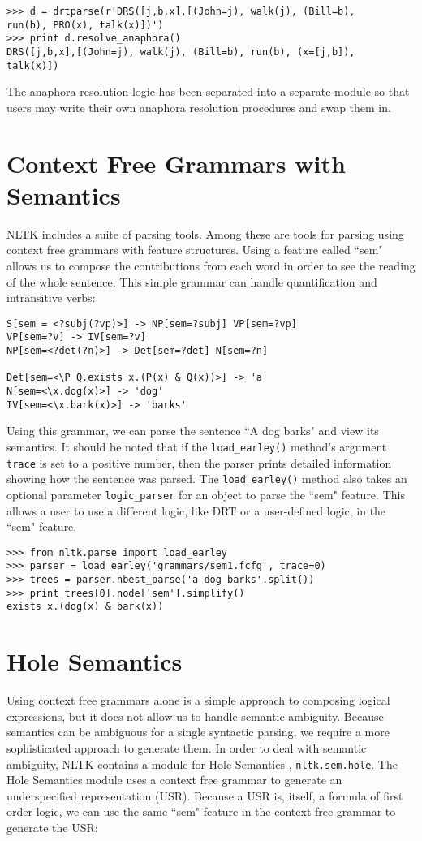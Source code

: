 \documentclass{article}
\newcommand{\dhgcode}[1]{{\tt #1}}
\begin{document}
\begin{verbatim}
>>> d = drtparse(r'DRS([j,b,x],[(John=j), walk(j), (Bill=b), 
run(b), PRO(x), talk(x)])')
>>> print d.resolve_anaphora()
DRS([j,b,x],[(John=j), walk(j), (Bill=b), run(b), (x=[j,b]), 
talk(x)])
\end{verbatim}

The anaphora resolution logic has been separated into a separate module so that users may write their own anaphora resolution procedures and swap them in.


\section{Context Free Grammars with Semantics}
NLTK includes a suite of parsing tools.  Among these are tools for parsing using context free grammars with feature structures.  Using a feature called ``sem" allows us to compose the contributions from each word in order to see the reading of the whole sentence.  This simple grammar can handle quantification and intransitive verbs:

\begin{verbatim}
S[sem = <?subj(?vp)>] -> NP[sem=?subj] VP[sem=?vp]
VP[sem=?v] -> IV[sem=?v]
NP[sem=<?det(?n)>] -> Det[sem=?det] N[sem=?n]

Det[sem=<\P Q.exists x.(P(x) & Q(x))>] -> 'a'
N[sem=<\x.dog(x)>] -> 'dog'
IV[sem=<\x.bark(x)>] -> 'barks'
\end{verbatim}

Using this grammar, we can parse the sentence ``A dog barks" and view its semantics.  It should be noted that if the \dhgcode{load\_earley()} method's argument \dhgcode{trace} is set to a positive number, then the parser prints detailed information showing how the sentence was parsed.  The \dhgcode{load\_earley()} method also takes an optional parameter \dhgcode{logic\_parser} for an object to parse the ``sem" feature.  This allows a user to use a different logic, like DRT or a user-defined logic, in the ``sem" feature.

\begin{verbatim}
>>> from nltk.parse import load_earley
>>> parser = load_earley('grammars/sem1.fcfg', trace=0)
>>> trees = parser.nbest_parse('a dog barks'.split())
>>> print trees[0].node['sem'].simplify()
exists x.(dog(x) & bark(x))
\end{verbatim}


\section{Hole Semantics}
Using context free grammars alone is a simple approach to composing logical expressions, but it does not allow us to handle semantic ambiguity.  Because semantics can be ambiguous for a single syntactic parsing, we require a more sophisticated approach to generate them.  In order to deal with semantic ambiguity, NLTK contains a module for Hole Semantics \cite{BB}, \dhgcode{nltk.sem.hole}.  The Hole Semantics module uses a context free grammar to generate an underspecified representation (USR).  Because a USR is, itself, a formula of first order logic, we can use the same ``sem" feature in the context free grammar to generate the USR:
\end{document}

